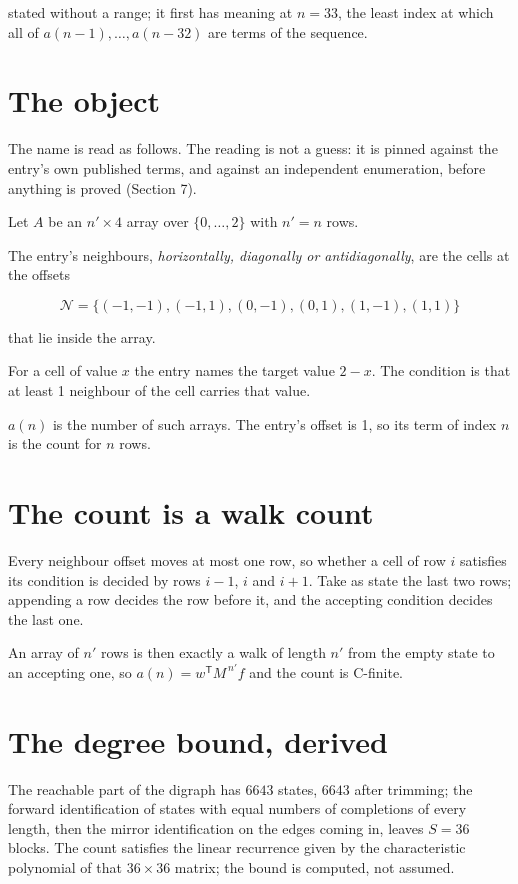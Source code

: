\documentclass[11pt]{article}
\theoremstyle{definition}
\begin{document}
stated without a range; it first has meaning at $n = 33$, the least index at which all of $a(n-1),\dots,a(n-32)$ are terms of the sequence.

\section{The object}

The name is read as follows. The reading is not a guess: it is pinned against the entry's own published terms, and against an independent enumeration, before anything is proved (Section 7).

Let $A$ be an $n' \times 4$ array over $\{0,\dots,2\}$ with $n' = n$ rows.

The entry's neighbours, {\itshape horizontally, diagonally or antidiagonally}, are the cells at the offsets

\[\mathcal{N} = \{(-1,-1), (-1,1), (0,-1), (0,1), (1,-1), (1,1)\}\]

that lie inside the array.

For a cell of value $x$ the entry names the target value $2 - x$. The condition is that at least 1 neighbour of the cell carries that value.

$a(n)$ is the number of such arrays. The entry's offset is 1, so its term of index $n$ is the count for $n$ rows.

\section{The count is a walk count}

Every neighbour offset moves at most one row, so whether a cell of row $i$ satisfies its condition is decided by rows $i-1$, $i$ and $i+1$. Take as state the last two rows; appending a row decides the row before it, and the accepting condition decides the last one.

An array of $n'$ rows is then exactly a walk of length $n'$ from the empty state to an accepting one, so $a(n) = w^{\mathsf T}M^{\,n'}f$ and the count is C-finite.

\section{The degree bound, derived}

The reachable part of the digraph has $6643$ states, $6643$ after trimming; the forward identification of states with equal numbers of completions of every length, then the mirror identification on the edges coming in, leaves $S = 36$ blocks. The count satisfies the linear recurrence given by the characteristic polynomial of that $36\times36$ matrix; the bound is computed, not assumed.
\end{document}
